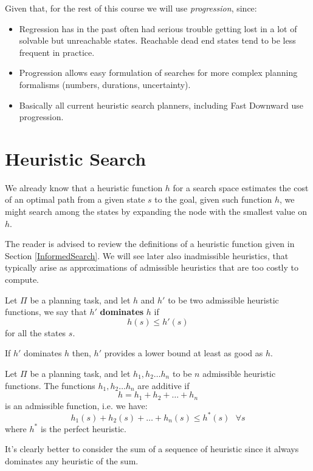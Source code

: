 \documentclass[10pt, letterpaper]{report}
\begin{document}
\noindent Given that, for the rest of this course we will use \textit{progression}, since:\begin{itemize}
    \item Regression has in the past often had serious trouble getting lost in
 a lot of solvable but unreachable states.
 Reachable dead end states tend to be less frequent in practice.
    \item Progression allows easy formulation of searches for more complex planning
 formalisms (numbers, durations, uncertainty).
 \item Basically all current heuristic search planners, including Fast Downward use progression.
\end{itemize}
\section{Heuristic Search}
We already know that a heuristic function $h$ for a search space estimates the cost of an optimal path from a given state  $s$ to the goal, given such function $h$, we might search among the states by expanding the node with the smallest value on $h$.

The reader is advised to review the definitions of a heuristic function given in Section \ref{InformedSearch}.
We will see later also  inadmissible heuristics, that typically arise as approximations of admissible
 heuristics that are too costly to compute.
 \begin{definition}[Domination]
    Let $\Pi$  be a planning task, and let $h$ and $h'$ to be two admissible heuristic functions, we say that $h'$ \textbf{dominates} $h$ if $$ h(s)\le h'(s)$$ for all the states $s$.
 \end{definition}
 If $h'$ dominates $h$ then, $h'$  provides a lower bound at least as good as $h$.
 \begin{definition}[Additivity]
    Let $\Pi$  be a planning task, and let $h_1,h_2\dots h_n$ to be $n$ admissible heuristic functions. The functions $h_1,h_2\dots h_n$ are additive if $$ h=h_1+h_2+\dots+ h_n$$
    is an admissible function, i.e. we have:\begin{equation}
        h_1(s)+h_2(s)+\dots+ h_n(s)\le h^*(s) \ \ \  \forall s
    \end{equation}
    where $h^*$ is the perfect heuristic.
 \end{definition}
 It's clearly better to consider the sum of a sequence of heuristic since it always dominates any heuristic of the sum.
\end{document}
